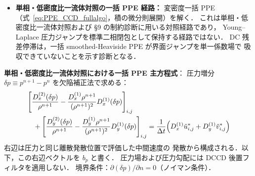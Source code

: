 \begin{itemize}[noitemsep,leftmargin=2em]
        式~\eqref{eq:capillary_range_projection} の
        $L_A/Z_A$ はこの診断用の圧力勾配代表であり，
        PPE 右辺と第7段の補正へ渡す標準補正量は
        成分補正済み補正量
        $\widehat c_{\sigma,f}=s_f-B_h\mu$ である．
        したがって非平衡界面の発散なし毛管成分を
        標準補正前に消さない．
        式~\eqref{eq:PPE_CCD_fullalgo} は使用しない．
  \item \textbf{単相・低密度比一流体対照の一括 PPE 経路：}
        変密度一括 PPE（式~\eqref{eq:PPE_CCD_fullalgo}，積の微分則展開）を解く．
        これは単相・低密度比一流体対照および §9 の制約診断に用いる対照経路であり，
        Young--Laplace 圧力ジャンプを標準二相閉包として保持する経路ではない．
        DC 残差停滞は，一括 smoothed-Heaviside PPE が界面ジャンプを単一係数場で
        吸収できていないことを示す診断となる．
\end{itemize}

\noindent\textbf{単相・低密度比一流体対照における一括 PPE 主方程式}：
圧力増分 $\delta p \equiv p^{n+1} - p^n$ を欠陥補正法で求める：
\begin{equation}
\begin{aligned}
  &\left[
    \frac{D_x^{(2)}(\delta p)}{\rho^{n+1}}
    - \frac{D_x^{(1)}\rho^{n+1}}{(\rho^{n+1})^2}
      D_x^{(1)}(\delta p)
  \right]_{i,j} \\
  &\quad+
  \left[
    \frac{D_y^{(2)}(\delta p)}{\rho^{n+1}}
    - \frac{D_y^{(1)}\rho^{n+1}}{(\rho^{n+1})^2}
      D_y^{(1)}(\delta p)
  \right]_{i,j}
  =
  \frac{1}{\Delta t}
  \Bigl(D_x^{(1)}\tilde{u}^*_{i,j}
        + D_y^{(1)}\tilde{v}^*_{i,j}\Bigr)
\end{aligned}
  \label{eq:PPE_CCD_fullalgo}
\end{equation}
右辺は圧力と同じ離散発散位置で評価した中間速度の
発散から構成される．以下，この右辺ベクトルを $b_p$ と書く．
圧力場および圧力勾配には DCCD 後置フィルタを適用しない．
境界条件：$\partial(\delta p)/\partial n = 0$（ノイマン条件）．

